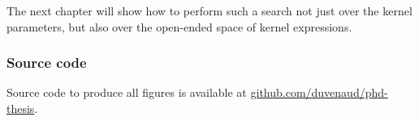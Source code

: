 The next chapter will show how to perform such a search not just over the kernel parameters, but also over the open-ended space of kernel expressions.

\subsubsection{Source code}
Source code to produce all figures is available at \url{github.com/duvenaud/phd-thesis}.






